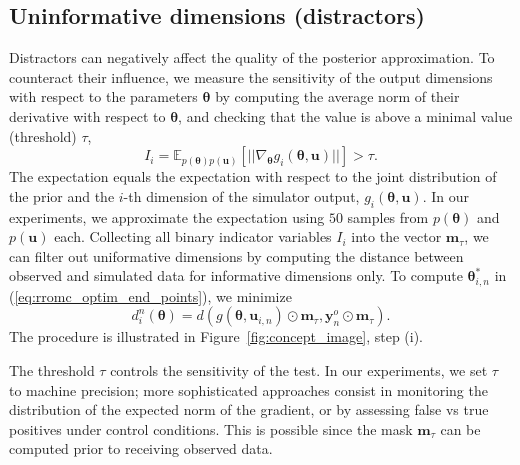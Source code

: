\documentclass[twoside]{article}
\newcommand{\thb}{\boldsymbol{\theta}}
\newcommand{\ub}{\mathbf{u}}
\newcommand{\yb}{\mathbf{y}}
\newcommand{\data}{\mathbf{y}^o}
\newcommand{\E}{\mathbb{E}}
\newcommand{\rromc}{R2OMC}
\newcommand{\mask}{\mathbf{m}_\tau}
\begin{document}

\subsection{Uninformative dimensions (distractors)}
\label{subsec:distractors}
Distractors can negatively affect the quality of the posterior approximation. To counteract their influence, we measure the sensitivity of the output dimensions with respect to the parameters $\thb$ by computing the average norm of their derivative with respect to $\thb$, and checking that the value is above a minimal value (threshold) $\tau$, 
\begin{equation}
  \label{eq:informative_dimensions}
  I_i = \E_{p(\thb)p(\ub)}\left[ || \nabla_{\thb} g_i(\thb, \ub) || \right] > \tau.
\end{equation}
The expectation equals the expectation with respect to the joint distribution of the prior and the $i$-th dimension of the simulator output, $g_i(\thb, \ub)$. In our experiments, we approximate the expectation using $50$ samples from $p(\thb)$ and $p(\ub)$ each. Collecting all binary indicator variables $I_i$ into the vector $\mask$, we can filter out uniformative dimensions by computing the distance between observed and simulated data for informative dimensions only. To compute $\thb_{i,n}^*$ in (\ref{eq:rromc_optim_end_points}), we minimize
\begin{equation}
d_i^n(\thb) = d(g(\thb, \ub_{i,n})\odot \mask, \data_n \odot \mask).
\label{eq:rromc-masked-distance}
\end{equation}
The procedure is illustrated in Figure~\ref{fig:concept_image}, step (i). 

The threshold $\tau$ controls the sensitivity of the test. In our experiments, we set $\tau$ to machine precision; more sophisticated approaches consist in monitoring the distribution of the expected norm of the gradient, or by assessing false vs true positives under control conditions. This is possible since the mask $\mask$ can be computed prior to receiving observed data.

\end{document}
